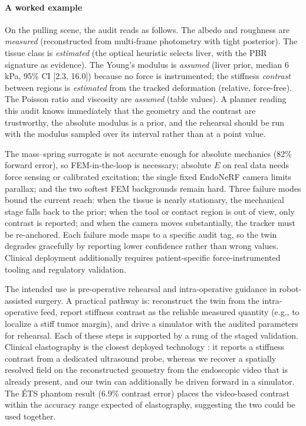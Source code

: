 \documentclass[review]{elsarticle}
\begin{document}
\paragraph{A worked example}
On the pulling scene, the audit reads as follows. The albedo and roughness
are \emph{measured} (reconstructed from multi-frame photometry with tight
posterior). The tissue class is \emph{estimated} (the optical heuristic
selects liver, with the PBR signature as evidence). The Young's modulus is
\emph{assumed} (liver prior, median 6\,kPa, 95\% CI [2.3, 16.0]) because no
force is instrumented; the stiffness \emph{contrast} between regions is
\emph{estimated} from the tracked deformation (relative, force-free). The
Poisson ratio and viscosity are \emph{assumed} (table values). A planner
reading this audit knows immediately that the geometry and the contrast are
trustworthy, the absolute modulus is a prior, and the rehearsal should be
run with the modulus sampled over its interval rather than at a point
value.

The mass--spring surrogate is not accurate enough for absolute mechanics
(82\% forward error), so FEM-in-the-loop is necessary; absolute $E$ on real
data needs force sensing or calibrated excitation; the single fixed
EndoNeRF camera limits parallax; and the two softest FEM backgrounds remain
hard. Three failure modes bound the current reach: when the tissue is
nearly stationary, the mechanical stage falls back to the prior; when the
tool or contact region is out of view, only contrast is reported; and when
the camera moves substantially, the tracker must be re-anchored. Each
failure mode maps to a specific audit tag, so the twin degrades gracefully
by reporting lower confidence rather than wrong values. Clinical deployment
additionally requires patient-specific force-instrumented tooling and
regulatory validation.

The intended use is pre-operative rehearsal and intra-operative guidance in
robot-assisted surgery. A practical pathway is: reconstruct the twin from
the intra-operative feed, report stiffness contrast as the reliable
measured quantity (e.g., to localize a stiff tumor margin), and drive a
simulator with the audited parameters for rehearsal. Each of these steps is
supported by a rung of the staged validation. Clinical elastography is the
closest deployed technology \citep{ophir1991}: it reports a stiffness
contrast from a dedicated ultrasound probe, whereas we recover a spatially
resolved field on the reconstructed geometry from the endoscopic video that
is already present, and our twin can additionally be driven forward in a
simulator. The \'ETS phantom result (6.9\% contrast error) places the
video-based contrast within the accuracy range expected of elastography,
suggesting the two could be used together.
\end{document}
